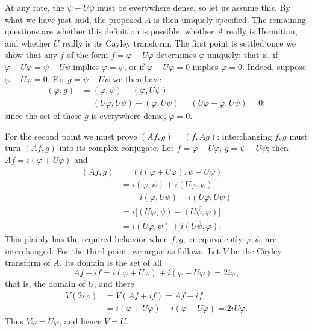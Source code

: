 \documentclass[fontsize=13pt,twoside,openany,headings=normal,parskip=false,bookmarkpackage=false,DIV=calc]{scrbook}
\begin{document}
\hypertarget{origpage-86}{}%
At any rate, the $\psi-U\psi$ must be everywhere dense, so let us assume this. By what we have just said, the proposed $A$ is then uniquely specified. The remaining questions are whether this definition is possible, whether $A$ really is Hermitian, and whether $U$ really is its Cayley transform. The first point is settled once we show that any $f$ of the form $f=\varphi-U\varphi$ determines $\varphi$ uniquely; that is, if $\varphi-U\varphi=\psi-U\psi$ implies $\varphi=\psi$, or if $\varphi-U\varphi=0$ implies $\varphi=0$. Indeed, suppose $\varphi-U\varphi=0$. For $g=\psi-U\psi$ we then have
\begin{align*}
(\varphi,g)&=(\varphi,\psi)-(\varphi,U\psi)\\
&=(U\varphi,U\psi)-(\varphi,U\psi)
=(U\varphi-\varphi,U\psi)=0;
\end{align*}
since the set of these $g$ is everywhere dense, $\varphi=0$.

For the second point we must prove $(Af,g)=(f,Ag)$: interchanging $f,g$ must turn $(Af,g)$ into its complex conjugate. Let $f=\varphi-U\varphi$, $g=\psi-U\psi$; then $Af=i(\varphi+U\varphi)$ and
\begin{align*}
(Af,g)&=(i(\varphi+U\varphi),\psi-U\psi)\\
&=i(\varphi,\psi)+i(U\varphi,\psi)\\
&\quad-i(\varphi,U\psi)-i(U\varphi,U\psi)\\
&=i\big[(U\varphi,\psi)-\overline{(U\psi,\varphi)}\big]\\
&=i(U\varphi,\psi)+\overline{i(U\psi,\varphi)}.
\end{align*}
This plainly has the required behavior when $f,g$, or equivalently $\varphi,\psi$, are interchanged. For the third point, we argue as follows. Let $V$ be the Cayley transform of $A$. Its domain is the set of all
\[
Af+if=i(\varphi+U\varphi)+i(\varphi-U\varphi)=2i\varphi,
\]
that is, the domain of $U$; and there
\begin{align*}
V(2i\varphi)&=V(Af+if)=Af-if\\
&=i(\varphi+U\varphi)-i(\varphi-U\varphi)=2iU\varphi.
\end{align*}
Thus $V\varphi=U\varphi$, and hence $V=U$.
\end{document}

